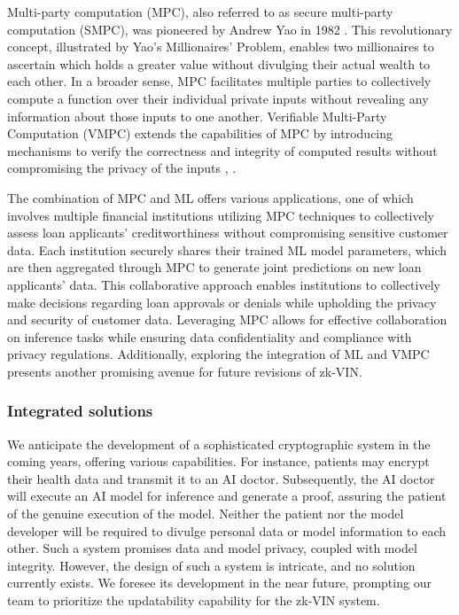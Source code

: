 \documentclass[conference]{IEEEtran}
\begin{document}
Multi-party computation (MPC), also referred to as secure multi-party computation (SMPC), was pioneered by Andrew Yao in 1982 \cite{Yao1982ProtocolsFS}. This revolutionary concept, illustrated by Yao's Millionaires' Problem, enables two millionaires to ascertain which holds a greater value without divulging their actual wealth to each other. In a broader sense, MPC facilitates multiple parties to collectively compute a function over their individual private inputs without revealing any information about those inputs to one another. Verifiable Multi-Party Computation (VMPC) extends the capabilities of MPC by introducing mechanisms to verify the correctness and integrity of computed results without compromising the privacy of the inputs \cite{Schoenmakers2015UniversallyVM}, \cite{Laud2014VerifiableCI}.

The combination of MPC and ML offers various applications, one of which involves multiple financial institutions utilizing MPC techniques to collectively assess loan applicants' creditworthiness without compromising sensitive customer data. Each institution securely shares their trained ML model parameters, which are then aggregated through MPC to generate joint predictions on new loan applicants' data. This collaborative approach enables institutions to collectively make decisions regarding loan approvals or denials while upholding the privacy and security of customer data. Leveraging MPC allows for effective collaboration on inference tasks while ensuring data confidentiality and compliance with privacy regulations. Additionally, exploring the integration of ML and VMPC presents another promising avenue for future revisions of zk-VIN.


\subsubsection{Integrated solutions}

We anticipate the development of a sophisticated cryptographic system in the coming years, offering various capabilities. For instance, patients may encrypt their health data and transmit it to an AI doctor. Subsequently, the AI doctor will execute an AI model for inference and generate a proof, assuring the patient of the genuine execution of the model. Neither the patient nor the model developer will be required to divulge personal data or model information to each other. Such a system promises data and model privacy, coupled with model integrity. However, the design of such a system is intricate, and no solution currently exists. We foresee its development in the near future, prompting our team to prioritize the updatability capability for the zk-VIN system.
\end{document}
